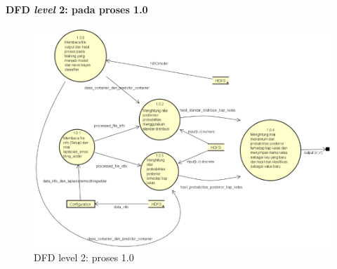 \paragraph{DFD \textit{level} 2: pada proses 1.0}
\begin{figure}[H]
	\centering
	\includegraphics[scale=0.7]{Diagram/DFD_1_1_Testing_Map}
	\caption[DFD level 2: proses 1.0]{DFD level 2: proses 1.0}
	\label{fig:DFD level 2: proses 1.0}
\end{figure}

